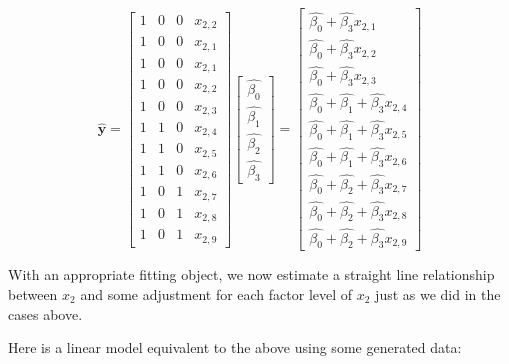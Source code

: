 \documentclass[
  oneside]{krantz}
\begin{document}
\[
\hat{\mathbf{y}} = 
\left[\begin{array}
{cccc}
1 & 0 & 0 & x_{2,2}\\ 
1 & 0 & 0 & x_{2,1}\\
1 & 0 & 0 & x_{2,1}\\
1 & 0 & 0 & x_{2,2}\\  
1 & 0 & 0 & x_{2,3}\\ 
1 & 1 & 0 & x_{2,4}\\
1 & 1 & 0 & x_{2,5}\\  
1 & 1 & 0 & x_{2,6}\\
1 & 0 & 1 & x_{2,7}\\
1 & 0 & 1 & x_{2,8}\\  
1 & 0 & 1 & x_{2,9}
\end{array}\right]
\left[\begin{array}
{r}
\hat{\beta_0}  \\
\hat{\beta_1}  \\
\hat{\beta_2} \\
\hat{\beta_3}
\end{array}\right]=
\left[\begin{array}
{c}
\hat{\beta_0} +     \hat{\beta_3} x_{2,1}\\
\hat{\beta_0} +   \hat{\beta_3} x_{2,2}\\
\hat{\beta_0} + \hat{\beta_3} x_{2,3}\\
\hat{\beta_0} + \hat{\beta_1}  + \hat{\beta_3} x_{2,4}\\
\hat{\beta_0} + \hat{\beta_1}  + \hat{\beta_3} x_{2,5}\\
\hat{\beta_0} + \hat{\beta_1}  + \hat{\beta_3} x_{2,6}\\
\hat{\beta_0} + \hat{\beta_2}  + \hat{\beta_3} x_{2,7}\\
\hat{\beta_0} + \hat{\beta_2}  + \hat{\beta_3} x_{2,8}\\
\hat{\beta_0} + \hat{\beta_2}  + \hat{\beta_3} x_{2,9} 
\end{array}\right]
\]

With an appropriate fitting object, we now estimate a straight line relationship between \(x_2\) and some adjustment for each factor level of \(x_2\) just as we did in the cases above.

Here is a linear model equivalent to the above using some generated data:
\end{document}
